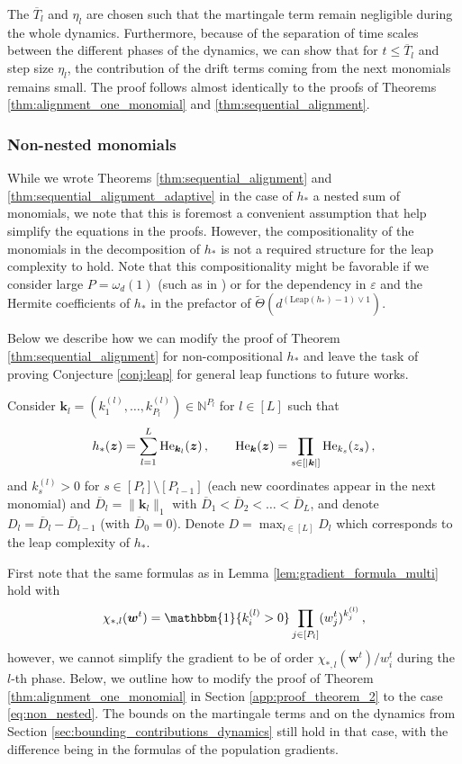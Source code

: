 \documentclass[11pt]{article}
\newcommand{\eps}{\varepsilon}
\newcommand{\<}{\langle}
\renewcommand{\>}{\rangle}
\theoremstyle{definition}
\def\bk{{\boldsymbol k}}
\def\bw{{\boldsymbol w}}
\def\bz{{\boldsymbol z}}
\def\naturals{{\mathbb N}}
\def\naturals{{\mathbb N}}
\def\bz{{\boldsymbol z}}
\def\He{{\rm He}}
\def\naturals{{\mathbb N}}
\def\bw{{\boldsymbol w}}
\def\bz{{\boldsymbol z}}
\def\He{{\rm He}}
\def\ind{\mathbbm{1}}
\def\eps{\varepsilon}
\def\Leap{\mathrm{Leap}}
\def\oT{\overline{T}}
\def\oD{\overline{D}}
\def\oD{\overline{D}}
\begin{document}
The $\oT_l$ and $\eta_l$ are chosen such that the martingale term remain negligible during the whole dynamics. Furthermore, because of the separation of time scales between the different phases of the dynamics, we can show that for $t \leq \oT_l$ and step size $\eta_l$, the contribution of the drift terms coming from the next monomials remains small. The proof follows almost identically to the proofs of Theorems \ref{thm:alignment_one_monomial} and \ref{thm:sequential_alignment}. 



\subsubsection{Non-nested monomials}
\label{sec:non_nested}

While we wrote Theorems \ref{thm:sequential_alignment} and \ref{thm:sequential_alignment_adaptive} in the case of $h_*$ a nested sum of monomials, we note that this is foremost a convenient assumption that help simplify the equations in the proofs. However, the compositionality of the monomials in the decomposition of $h_*$ is not a required structure for the leap complexity to hold. Note that this compositionality might be favorable if we consider large $P = \omega_d (1)$ (such as in \cite{abbe2021staircase}) or for the dependency in $\eps$ and the Hermite coefficients of $h_*$ in the prefactor of $\widetilde{\Theta} ( d^{(\Leap (h_*) -1) \vee 1})$.

Below we describe how we can modify the proof of Theorem \ref{thm:sequential_alignment} for non-compositional $h_*$ and leave the task of proving Conjecture \ref{conj:leap} for general leap functions to future works. 

Consider $\bk_l = (k^{(l)}_1, \ldots , k^{(l)}_{P_l} ) \in \naturals^{P_l}$ for $l \in [L]$ such that
\begin{equation}\label{eq:non_nested}
h_* ( \bz) = \sum_{l = 1}^L \He_{\bk_l} (\bz) \, , \qquad \He_{\bk} (\bz) = \prod_{s \in [|\bk|]} \He_{k_s} (z_s) \, ,
\end{equation}
and $k^{(l)}_s >0$ for $s \in [P_l]\setminus [P_{l-1}]$ (each new coordinates appear in the next monomial) and $\oD_l = \| \bk_l \|_1$ with $\oD_1 < \oD_2 < \ldots < \oD_L$, and denote $D_l = \oD_l - \oD_{l-1}$ (with $\oD_0 = 0$). Denote $D = \max_{l \in [L]} D_l$ which corresponds to the leap complexity of $h_*$. 

First note that the same formulas as in Lemma \ref{lem:gradient_formula_multi} hold with 
\[
\chi_{*,l} (\bw^t) = \ind \{k_i^{(l)} >0 \} \prod_{j \in [P_l]} (w_j^t)^{k_j^{(l)}}\, , 
\]
however, we cannot simplify the gradient to be of order $\chi_{*,l} (\bw^t)/w_i^t$ during the $l$-th phase. Below, we outline how to modify the proof of Theorem \ref{thm:alignment_one_monomial} in Section \ref{app:proof_theorem_2} to the case \eqref{eq:non_nested}. The bounds on the martingale terms and on the dynamics from Section \ref{sec:bounding_contributions_dynamics} still hold in that case, with the difference being in the formulas of the population gradients.
\end{document}
